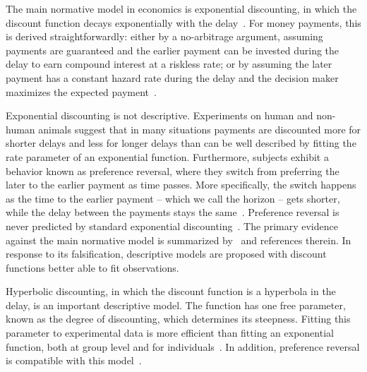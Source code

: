 The main normative model in economics is exponential discounting, in which the discount function decays exponentially with the delay~\citep{Samuelson1937}. For money payments, this is derived straightforwardly: either by a no-arbitrage argument, assuming payments are guaranteed and the earlier payment can be invested during the delay to earn compound interest at a riskless rate; or by assuming the later payment has a constant hazard rate %
during the delay and the decision maker maximizes the expected payment~\citep{Kacelnik1997}.

Exponential discounting is not descriptive. Experiments on human and non-human animals suggest that in many situations payments are discounted more for shorter delays and less for longer delays than can be well described by fitting the rate parameter of an exponential function. Furthermore, subjects exhibit a behavior known as preference reversal, where they switch from preferring the later to the earlier payment as time passes. More specifically, the switch happens as the time to the earlier payment -- which we call the horizon -- gets shorter, while the delay between the payments stays the same~\citep[p.~288]{KerenRoelofsma1995}. Preference reversal is never predicted by standard exponential discounting~\citep[Fig~2]{GreenMyerson1996}. The primary evidence against the main normative model is summarized by~\citet{MyersonGreen1995} and references therein. In response to its falsification, descriptive models are proposed with discount functions better able to fit observations.

Hyperbolic discounting, in which the discount function is a hyperbola in the delay, is an important descriptive model. The function has one free parameter, known as the degree of discounting, which determines its steepness. Fitting this parameter to experimental data is more efficient than fitting an exponential function, both at group level and for individuals~\citep{MyersonGreen1995}. In addition, preference reversal is compatible with this model~\citep[Fig.~2]{GreenMyerson1996}.


